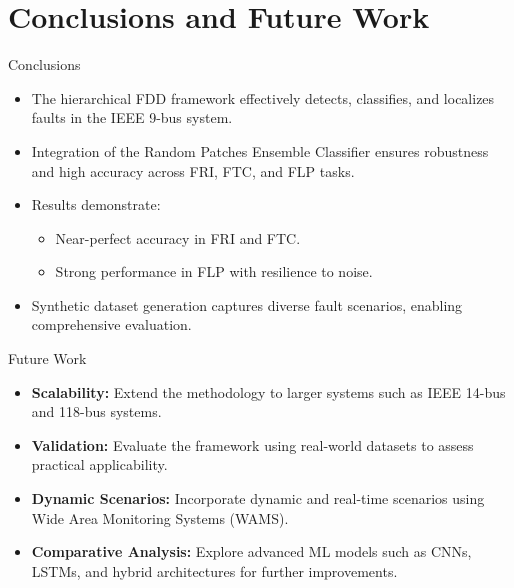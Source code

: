 \section{Conclusions and Future Work}

\begin{frame}{Conclusions}
  \begin{itemize}
    \item The hierarchical FDD framework effectively detects, classifies, and localizes faults in the IEEE 9-bus system.
    \item Integration of the Random Patches Ensemble Classifier ensures robustness and high accuracy across FRI, FTC, and FLP tasks.
    \item Results demonstrate:
    \begin{itemize}
      \item Near-perfect accuracy in FRI and FTC.
      \item Strong performance in FLP with resilience to noise.
    \end{itemize}
    \item Synthetic dataset generation captures diverse fault scenarios, enabling comprehensive evaluation.
  \end{itemize}
\end{frame}

\begin{frame}{Future Work}
  \begin{itemize}
    \item \textbf{Scalability:} Extend the methodology to larger systems such as IEEE 14-bus and 118-bus systems.
    \item \textbf{Validation:} Evaluate the framework using real-world datasets to assess practical applicability.
    \item \textbf{Dynamic Scenarios:} Incorporate dynamic and real-time scenarios using Wide Area Monitoring Systems (WAMS).
    \item \textbf{Comparative Analysis:} Explore advanced ML models such as CNNs, LSTMs, and hybrid architectures for further improvements.
  \end{itemize}
\end{frame}
